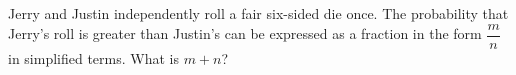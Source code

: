 Jerry and Justin independently roll a fair six-sided die once. The probability that Jerry's roll is greater than Justin's can be expressed as a fraction in the form $\dfrac{m}{n}$ in simplified terms. What is $m + n$?
